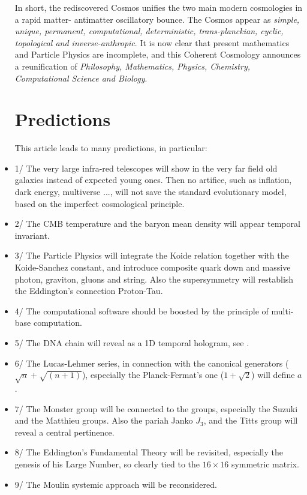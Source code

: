 \documentclass[twoside,draft]{article}
\begin{document}
\begin{sloppypar}
\begin{itemize}
In short, the rediscovered Cosmos unifies the two main modern cosmologies in a rapid matter-
antimatter oscillatory bounce. The Cosmos appear as \textit{simple, unique, permanent, computational,
deterministic, trans-planckian, cyclic, topological and inverse-anthropic}. It is now clear that present mathematics and Particle Physics are incomplete, and this Coherent Cosmology announces a reunification of \textit{Philosophy, Mathematics, Physics, Chemistry, Computational Science and Biology}.



\section{Predictions}

 

      This article leads to many predictions, in particular:
\item 1/  The very large infra-red telescopes will show in the very far field old galaxies instead of expected young ones. Then no artifice, such as inflation, dark energy, multiverse ..., will not save the standard evolutionary model, based on the imperfect cosmological principle.
\item 2/ The CMB temperature and the baryon mean density will appear temporal invariant. 
\item 3/ The Particle Physics will integrate the Koide relation together with the Koide-Sanchez constant, and introduce composite quark down and massive photon, graviton, gluons and string. Also the supersymmetry will restablish the Eddington's connection Proton-Tau.
\item 4/ The computational software should be boosted by the principle of multi-base computation.
\item 5/ The DNA chain will reveal as a 1D temporal hologram, see \cite{Widom}.
\item 6/ The Lucas-Lehmer series, in connection with the canonical generators ($\sqrt{n}+\sqrt{(n+1)}$), especially the Planck-Fermat's one ($1+\sqrt2$) will define $a$.
\item 7/ The Monster group will be connected to the  groups, especially the Suzuki and the Matthieu groups. Also the pariah Janko $J_3$, and the Titts group will reveal a central pertinence.
\item 8/ The Eddington's Fundamental Theory will be revisited, especially the genesis of his Large Number, so clearly tied to the $16 \times 16$ symmetric matrix.
\item 9/ The Moulin systemic approach will be reconsidered.
\end{itemize}


\end{sloppypar}
\end{document}
